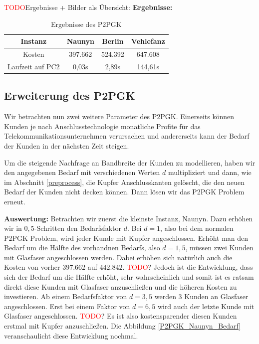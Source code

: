 \documentclass[11pt,a4paper]{article}
\newcommand{\TODO}{\textcolor{red}{TODO}}
\theoremstyle{my_th_style1}
\begin{document}
\TODO Ergebnisse + Bilder als Übersicht:
\textbf{Ergebnisse:} 
\begin{table}[h]
	\centering
	\begin{tabular}{c|c|c|c}
		Instanz & Naunyn & Berlin & Vehlefanz \\	
		\hline
		Kosten & 397.662 & 524.392 & 647.608 \\
		Laufzeit auf PC2 & 0,03s & 2,89s & 144,61s \\
	\end{tabular}
	\label{P2PGK}
	\caption{Ergebnisse des P2PGK} 
\end{table}

\subsection{Erweiterung des P2PGK}
Wir betrachten nun zwei weitere Parameter des P2PGK.
Einerseits k\"onnen Kunden je nach Anschlusstechnologie monatliche Profite f\"ur das Telekommunikationsunternehmen verursachen und andererseits kann der Bedarf der Kunden in der n\"achsten Zeit steigen.

Um die steigende Nachfrage an Bandbreite der Kunden zu modellieren, haben wir den angegebenen Bedarf mit verschiedenen Werten $d$ multipliziert und dann, wie im Abschnitt \ref{preprocess}, die Kupfer Anschlusskanten gelöscht, die den neuen Bedarf der Kunden nicht decken können.
Dann lösen wir das P2PGK Problem erneut. 

\textbf{Auswertung:}
Betrachten wir zuerst die kleinste Instanz, Naunyn. Dazu erhöhen wir in $0,5$-Schritten den Bedarfsfaktor $d$. Bei $d=1$, also bei dem normalen P2PGK Problem, wird jeder Kunde mit Kupfer angeschlossen. Erhöht man den Bedarf um die Hälfte des vorhandnen Bedarfs, also $d=1,5$, müssen zwei Kunden mit Glasfaser angeschlossen werden. Dabei erhöhen sich natürlich auch die Kosten von vorher $397.662$ auf $442.842$.
\TODO? Jedoch ist die Entwicklung, dass sich der Bedarf um die Hälfte erhöht, sehr wahrscheinlich und somit ist es ratsam direkt diese Kunden mit Glasfaser anzuschließen und die höheren Kosten zu investieren.
Ab einem Bedarfsfaktor von $d=3,5$ werden 3 Kunden an Glasfaser angeschlossen. Erst bei einem Faktor von $d=6,5$ wird auch der letzte Kunde mit Glasfaser angeschlossen. 
\TODO? Es ist also kostensparender diesen Kunden erstmal mit Kupfer anzuschließen. Die Abbildung \ref{P2PGK_Naunyn_Bedarf} veranschaulicht diese Entwicklung nochmal.
\end{document}
